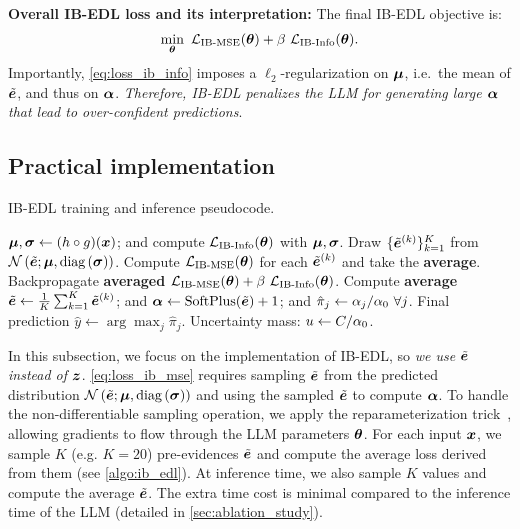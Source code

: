 \textbf{Overall IB-EDL loss and its interpretation:} The final IB-EDL objective is:
\begin{equation}
    \begin{aligned}
        \min_{\bm{\theta}} \  \mathcal{L}_{\text{IB-MSE}}(\bm{\theta}) + \beta \ \mathcal{L}_{\text{IB-Info}}(\bm{\theta}).
    \end{aligned}
\end{equation}
Importantly, \cref{eq:loss_ib_info} imposes a $\ell_2$-regularization on $\bm{\mu}$, i.e.\ the mean of $\tilde{\bm{e}}$, and thus on $\bm{\alpha}$. \emph{Therefore, IB-EDL penalizes the LLM for generating large $\bm{\alpha}$ that lead to over-confident predictions}. 
\subsection{Practical implementation}
\begin{algorithm}[t]
    \caption{IB-EDL training and inference pseudocode.}
    \label{algo:ib_edl}
    \begin{algorithmic}[1]
        \State $\bm{\mu}, \bm{\sigma} \gets (h \circ g) (\bm{x})$; and compute $\mathcal{L}_{\text{IB-Info}}(\bm{\theta})$ with $\bm{\mu}, \bm{\sigma}$.  
        \State Draw $\{\tilde{\bm{e}}^{(k)}\}_{k=1}^K$ from $\mathcal{N}\left( \tilde{\bm{e}} ; \bm{\mu}, \text{diag}\left( \bm{\sigma} \right) \right)$. 
         
            \State Compute $\mathcal{L}_{\text{IB-MSE}}(\bm{\theta})$ for each $\tilde{\bm{e}}^{(k)}$ and take the \textbf{average}. 
            \State Backpropagate \textbf{averaged} $\mathcal{L}_{\text{IB-MSE}}(\bm{\theta}) + \beta \ \mathcal{L}_{\text{IB-Info}}(\bm{\theta})$.
        \Else {}
            \State Compute \textbf{average} $\tilde{\bm{e}} \gets \frac{1}{K} \sum_{k=1}^K \tilde{\bm{e}}^{(k)}$; and $\bm{\alpha} \gets \text{SoftPlus}(\tilde{\bm{e}}) + 1$; and $\hat{\pi}_j \gets \alpha_j / \alpha_0 \ \forall j$.
            \State Final prediction $\hat{y} \gets \arg \max_j \hat{\pi}_j$. Uncertainty mass: $u \gets C / \alpha_0$.
        \EndIf
    \end{algorithmic}
\end{algorithm}
In this subsection, we focus on the implementation of IB-EDL, so \emph{we use $\tilde{\bm{e}}$ instead of $\bm{z}$}.  \cref{eq:loss_ib_mse} requires sampling $\tilde{\bm{e}}$ from the predicted distribution $\mathcal{N}\left( \tilde{\bm{e}} ; \bm{\mu}, \text{diag}\left( \bm{\sigma} \right) \right)$ and using the sampled $\tilde{\bm{e}}$ to compute $\bm{\alpha}$. To handle the non-differentiable sampling operation, we apply the reparameterization trick~\citep{kingma2014auto}, allowing gradients to flow through the LLM parameters $\bm{\theta}$. For each input $\bm{x}$, we sample $K$ (e.g. $K=20$) pre-evidences $\tilde{\bm{e}}$ and compute the average loss derived from them (see \cref{algo:ib_edl}). At inference time, we also sample $K$ values  and compute the average $\tilde{\bm{e}}$.
The extra time cost is minimal compared to the inference time of the LLM (detailed in \cref{sec:ablation_study}). 

